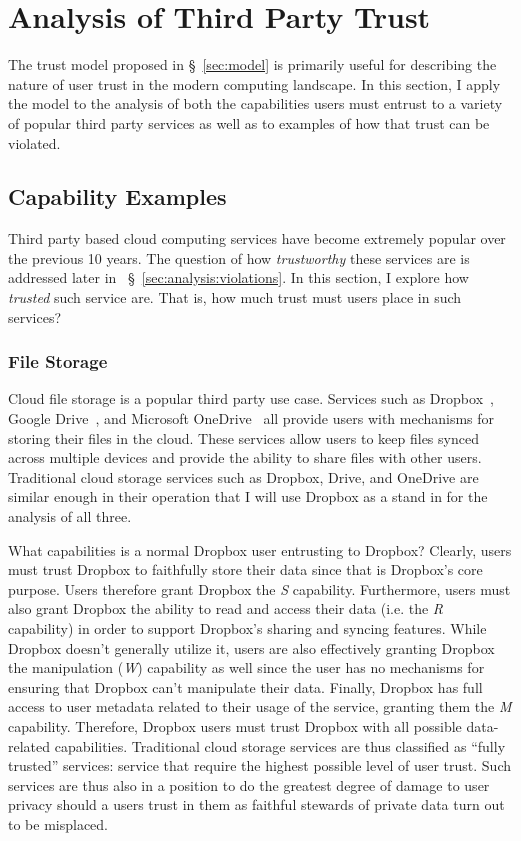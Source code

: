 \section{Analysis of Third Party Trust}
\label{sec:analysis}

The trust model proposed in \S~\ref{sec:model} is primarily useful for
describing the nature of user trust in the modern computing
landscape. In this section, I apply the model to the analysis of both
the capabilities users must entrust to a variety of popular third
party services as well as to examples of how that trust can be
violated.

\subsection{Capability Examples}
\label{sec:analysis:capabilities}

Third party based cloud computing services have become extremely
popular over the previous 10 years.  The question of how
\textit{trustworthy} these services are is addressed later in
~\S~\ref{sec:analysis:violations}. In this section, I explore how
\textit{trusted} such service are. That is, how much trust must users
place in such services?

\subsubsection{File Storage}

Cloud file storage is a popular third party use case. Services such as
Dropbox~\cite{dropbox}, Google Drive~\cite{google-drive}, and
Microsoft OneDrive~\cite{microsoft-onedrive} all provide users with
mechanisms for storing their files in the cloud. These services allow
users to keep files synced across multiple devices and provide the
ability to share files with other users. Traditional cloud storage
services such as Dropbox, Drive, and OneDrive are similar enough in
their operation that I will use Dropbox as a stand in for the analysis
of all three.

What capabilities is a normal Dropbox user entrusting to Dropbox?
Clearly, users must trust Dropbox to faithfully store their data since
that is Dropbox's core purpose. Users therefore grant Dropbox the
\emph{S} capability. Furthermore, users must also grant Dropbox the
ability to read and access their data (i.e. the \emph{R} capability)
in order to support Dropbox's sharing and syncing features. While
Dropbox doesn't generally utilize it, users are also effectively
granting Dropbox the manipulation (\emph{W}) capability as well since
the user has no mechanisms for ensuring that Dropbox can't manipulate
their data. Finally, Dropbox has full access to user metadata related
to their usage of the service, granting them the \emph{M}
capability. Therefore, Dropbox users must trust Dropbox with all
possible data-related capabilities. Traditional cloud storage services
are thus classified as ``fully trusted'' services: service that
require the highest possible level of user trust. Such services are
thus also in a position to do the greatest degree of damage to user
privacy should a users trust in them as faithful stewards of private
data turn out to be misplaced.

